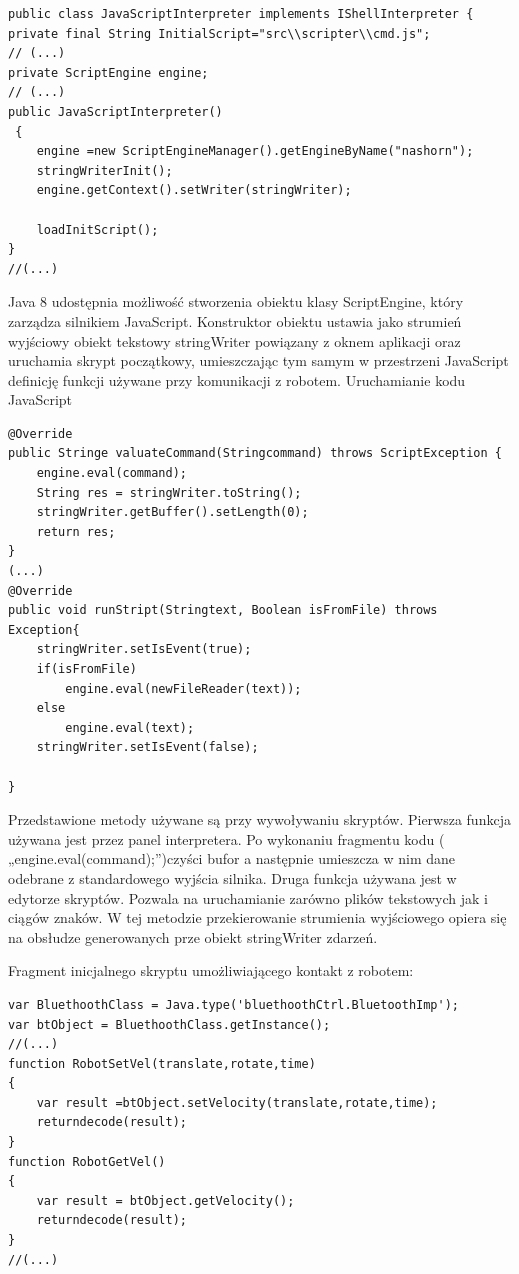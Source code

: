 \documentclass[eng,printmode]{mgr}
\begin{document}
\begin{lstlisting}[style=java]
public class JavaScriptInterpreter implements IShellInterpreter {	
private final String InitialScript="src\\scripter\\cmd.js";
// (...)
private ScriptEngine engine;
// (...)
public JavaScriptInterpreter()
 {
	engine =new ScriptEngineManager().getEngineByName("nashorn");
	stringWriterInit();
	engine.getContext().setWriter(stringWriter);
		
	loadInitScript();		
}
//(...)
\end{lstlisting}

Java 8 udostępnia możliwość stworzenia obiektu klasy ScriptEngine, który zarządza silnikiem JavaScript. Konstruktor obiektu ustawia jako strumień wyjściowy obiekt  tekstowy  stringWriter powiązany z oknem aplikacji oraz uruchamia skrypt początkowy, umieszczając tym samym w przestrzeni JavaScript definicję funkcji używane przy komunikacji z robotem.
Uruchamianie kodu JavaScript
\begin{lstlisting}[style=java]
@Override
public Stringe valuateCommand(Stringcommand) throws ScriptException {
	engine.eval(command);
	String res = stringWriter.toString();
	stringWriter.getBuffer().setLength(0);
	return res;
}
(...)
@Override
public void runStript(Stringtext, Boolean isFromFile) throws Exception{
	stringWriter.setIsEvent(true);
	if(isFromFile)
		engine.eval(newFileReader(text));
	else
		engine.eval(text);
	stringWriter.setIsEvent(false);
		
}

\end{lstlisting}
Przedstawione metody używane są przy wywoływaniu skryptów. Pierwsza funkcja używana jest przez panel interpretera. Po wykonaniu fragmentu kodu ( „engine.eval(command);”)czyści bufor a następnie umieszcza w nim dane odebrane z standardowego wyjścia silnika. Druga funkcja używana jest w edytorze skryptów. Pozwala na uruchamianie zarówno plików tekstowych jak i ciągów znaków. W tej metodzie przekierowanie strumienia wyjściowego opiera się na obsłudze generowanych prze obiekt stringWriter  zdarzeń.

Fragment inicjalnego skryptu umożliwiającego kontakt z robotem:
\begin{lstlisting}[style=java]
var BluethoothClass = Java.type('bluethoothCtrl.BluetoothImp');
var btObject = BluethoothClass.getInstance();
//(...)
function RobotSetVel(translate,rotate,time)
{
	var result =btObject.setVelocity(translate,rotate,time);
	returndecode(result);
}
function RobotGetVel()
{
	var result = btObject.getVelocity();
	returndecode(result);
}
//(...)
\end{lstlisting}
\end{document}

